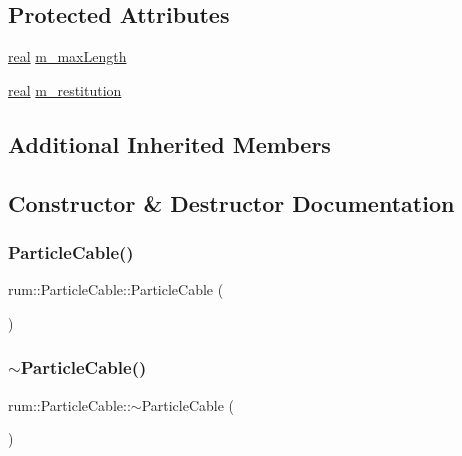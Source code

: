 \subsection*{Protected Attributes}
\begin{DoxyCompactItemize}
\item 
\mbox{\hyperlink{namespacerum_a7e8cca23573d5eaead0f138cbaa4862c}{real}} \mbox{\hyperlink{classrum_1_1_particle_cable_a7232daf25d24eff2f98e03918bfbfb7c}{m\+\_\+max\+Length}}
\item 
\mbox{\hyperlink{namespacerum_a7e8cca23573d5eaead0f138cbaa4862c}{real}} \mbox{\hyperlink{classrum_1_1_particle_cable_affbb776b02c85a36d0d0bb1ca6f4234a}{m\+\_\+restitution}}
\end{DoxyCompactItemize}
\subsection*{Additional Inherited Members}


\subsection{Constructor \& Destructor Documentation}
\mbox{\label{classrum_1_1_particle_cable_ad2b529c1d51b6af9f3c2e7f535e64c0c}} 
\subsubsection{\texorpdfstring{Particle\+Cable()}{ParticleCable()}}
{\footnotesize\ttfamily rum\+::\+Particle\+Cable\+::\+Particle\+Cable (\begin{DoxyParamCaption}{ }\end{DoxyParamCaption})\hspace{0.3cm}{\ttfamily [explicit]}}

\mbox{\label{classrum_1_1_particle_cable_aac2552bf3ddefc5c59fd7953a719b43a}} 
\subsubsection{\texorpdfstring{$\sim$\+Particle\+Cable()}{~ParticleCable()}}
{\footnotesize\ttfamily rum\+::\+Particle\+Cable\+::$\sim$\+Particle\+Cable (\begin{DoxyParamCaption}{ }\end{DoxyParamCaption})}



